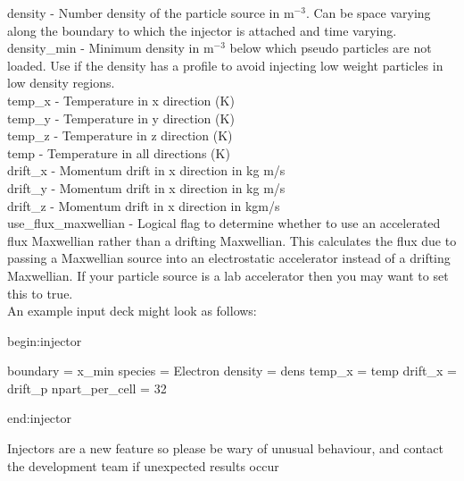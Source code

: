 {\emphtext density} - Number density of the particle source in m$^{-3}$. Can
  be space varying along the boundary to which the injector is attached and
  time varying.\\

{\emphtext density\_min} - Minimum density in m$^{-3}$ below which pseudo
  particles are not loaded. Use if the density has a profile to avoid
  injecting low weight particles in low density regions.\\

{\emphtext temp\_x} - Temperature in x direction (K)\\

{\emphtext temp\_y} - Temperature in y direction (K)\\

{\emphtext temp\_z} - Temperature in z direction (K)\\

{\emphtext temp} - Temperature in all directions (K)\\

{\emphtext drift\_x} - Momentum drift in x direction in kg m/s\\

{\emphtext drift\_y} - Momentum drift in x direction in kg m/s\\

{\emphtext drift\_z} - Momentum drift in x direction in kgm/s\\

{\emphtext use\_flux\_maxwellian} - Logical flag to determine whether to use
  an accelerated flux Maxwellian rather than a drifting Maxwellian. This
  calculates the flux due to passing a Maxwellian source into an electrostatic
  accelerator instead of a drifting Maxwellian. If your particle source is a
  lab accelerator then you may want to set this to true.\\

An example input deck might look as follows:\\

\begin{boxverbatim}
begin:injector

  boundary = x_min
  species = Electron
  density = dens
  temp_x = temp
  drift_x = drift_p
  npart_per_cell = 32

end:injector
\end{boxverbatim}

{\emphtext
Injectors are a new feature so please be wary of unusual behaviour, and
contact the {\EPOCH} development team if unexpected results occur}

